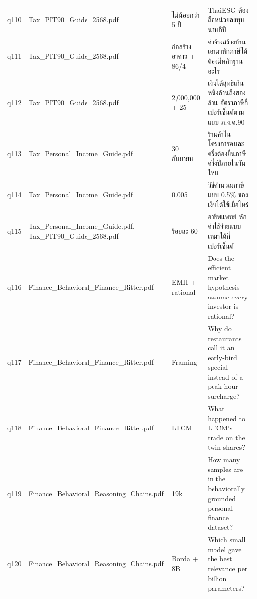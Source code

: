 \documentclass[11pt,a4paper]{article}
\begin{document}
{\begin{longtable}{lp{3.6cm}p{3.4cm}p{6.3cm}}
q110 & Tax\_\allowbreak{}PIT90\_\allowbreak{}Guide\_\allowbreak{}2568.pdf & {\thaifont ไม่น้อยกว่า }5 {\thaifont ปี} & ThaiESG {\thaifont ต้องถือหน่วยลงทุนนานกี่ปี} \\
q111 & Tax\_\allowbreak{}PIT90\_\allowbreak{}Guide\_\allowbreak{}2568.pdf & {\thaifont ก่อสร้างอาคาร }+ 86/4 & {\thaifont ค่าจ้างสร้างบ้านเอามาหักภาษีได้ ต้องมีหลักฐานอะไร} \\
q112 & Tax\_\allowbreak{}PIT90\_\allowbreak{}Guide\_\allowbreak{}2568.pdf & 2,000,000 + 25 & {\thaifont เงินได้สุทธิเกินหนึ่งล้านถึงสองล้าน อัตราภาษีกี่เปอร์เซ็นต์ตามแบบ ภ}.{\thaifont ง}.{\thaifont ด}.90 \\
q113 & Tax\_\allowbreak{}Personal\_\allowbreak{}Income\_\allowbreak{}Guide.pdf & 30 {\thaifont กันยายน} & {\thaifont ร้านค้าในโครงการคนละครึ่งต้องยื่นภาษีครึ่งปีภายในวันไหน} \\
q114 & Tax\_\allowbreak{}Personal\_\allowbreak{}Income\_\allowbreak{}Guide.pdf & 0.005 & {\thaifont วิธีคำนวณภาษีแบบ }0.5\% {\thaifont ของเงินได้ใช้เมื่อไหร่} \\
q115 & Tax\_\allowbreak{}Personal\_\allowbreak{}Income\_\allowbreak{}Guide.pdf, Tax\_\allowbreak{}PIT90\_\allowbreak{}Guide\_\allowbreak{}2568.pdf & {\thaifont ร้อยละ }60 & {\thaifont อาชีพแพทย์ หักค่าใช้จ่ายแบบเหมาได้กี่เปอร์เซ็นต์} \\
q116 & Finance\_\allowbreak{}Behavioral\_\allowbreak{}Finance\_\allowbreak{}Ritter.pdf & EMH + rational & Does the efficient market hypothesis assume every investor is rational? \\
q117 & Finance\_\allowbreak{}Behavioral\_\allowbreak{}Finance\_\allowbreak{}Ritter.pdf & Framing & Why do restaurants call it an early-bird special instead of a peak-hour surcharge? \\
q118 & Finance\_\allowbreak{}Behavioral\_\allowbreak{}Finance\_\allowbreak{}Ritter.pdf & LTCM & What happened to LTCM's trade on the twin shares? \\
q119 & Finance\_\allowbreak{}Behavioral\_\allowbreak{}Reasoning\_\allowbreak{}Chains.pdf & 19k & How many samples are in the behaviorally grounded personal finance dataset? \\
q120 & Finance\_\allowbreak{}Behavioral\_\allowbreak{}Reasoning\_\allowbreak{}Chains.pdf & Borda + 8B & Which small model gave the best relevance per billion parameters? \\
\end{longtable}}
\end{document}
